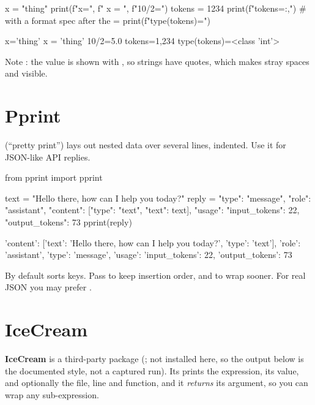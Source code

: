 \begin{pycode}
x = "thing"
print(f"{x=}", f"{ x = }", f"{10/2=}")
tokens = 1234
print(f"{tokens=:,}")                   # with a format spec after the =
print(f"{type(tokens)=}")
\end{pycode}
\begin{rawcode}
x='thing'  x = 'thing' 10/2=5.0
tokens=1,234
type(tokens)=<class 'int'>
\end{rawcode}

Note : the value is shown with , so strings have quotes, which makes stray spaces and  visible.

\section{Pprint}

 (``pretty print'') lays out nested data over several lines, indented. Use it for JSON-like API replies.

\begin{pycode}
from pprint import pprint

text = "Hello there, how can I help you today?"
reply = {"type": "message", "role": "assistant",
         "content": [{"type": "text", "text": text}],
         "usage": {"input_tokens": 22, "output_tokens": 73}}
pprint(reply)
\end{pycode}
\begin{rawcode}
{'content': [{'text': 'Hello there, how can I help you today?',
              'type': 'text'}],
 'role': 'assistant',
 'type': 'message',
 'usage': {'input_tokens': 22, 'output_tokens': 73}}
\end{rawcode}

By default  sorts keys. Pass  to keep insertion order, and  to wrap sooner.
For real JSON you may prefer .

\section{IceCream}

\textbf{IceCream} is a third-party package (; not installed here, so the output below is
the documented style, not a captured run). Its  prints the expression, its value, and optionally the file, line
and function, and it \emph{returns} its argument, so you can wrap any sub-expression.

